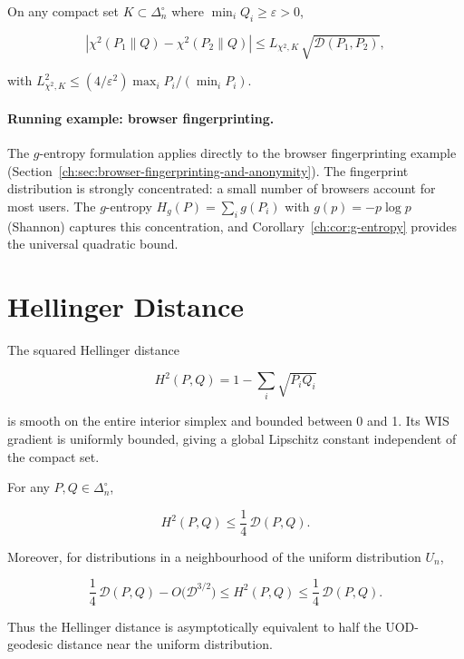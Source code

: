 \begin{corollary}

On any compact set \(K\subset\Delta_n^\circ\) where
\(\min_i Q_i\ge\varepsilon>0\),

\[
|\chi^2(P_1\|Q)-\chi^2(P_2\|Q)|
\le
L_{\chi^2,K}\,\sqrt{\mathcal D(P_1,P_2)},
\]

with \(L_{\chi^2,K}^2\le
(4/\varepsilon^2)\max_i P_i/(\min_i P_i)\).
\end{corollary}

\paragraph{Running example: browser fingerprinting.}
The $g$-entropy formulation applies directly to the browser fingerprinting example (Section~\ref{ch:sec:browser-fingerprinting-and-anonymity}).  The fingerprint distribution is strongly concentrated: a small number of browsers account for most users.  The $g$-entropy $H_g(P)=\sum_i g(P_i)$ with $g(p)=-p\log p$ (Shannon) captures this concentration, and Corollary~\ref{ch:cor:g-entropy} provides the universal quadratic bound.

\section{Hellinger Distance}\label{ch:sec:hellinger-distance}

The squared Hellinger distance

\[
H^2(P,Q) = 1-\sum_i\sqrt{P_iQ_i}
\]

is smooth on the entire interior simplex and bounded between 0 and 1.
Its WIS gradient is uniformly bounded, giving a global Lipschitz
constant independent of the compact set.

\begin{theorem}
\label{ch:thm:hellinger}
For any \(P,Q\in\Delta_n^\circ\),

\[
H^2(P,Q) \le \frac14\,\mathcal D(P,Q).
\]

Moreover, for distributions in a neighbourhood of the uniform
distribution \(U_n\),

\[
\frac14\,\mathcal D(P,Q) - O\bigl(\mathcal D^{3/2}\bigr)
\le H^2(P,Q)
\le \frac14\,\mathcal D(P,Q).
\]

Thus the Hellinger distance is asymptotically equivalent to half the
UOD-geodesic distance near the uniform distribution.
\end{theorem}


